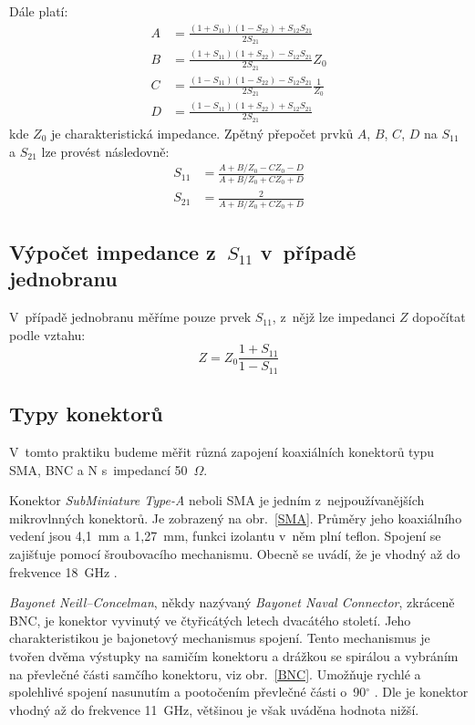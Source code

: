 \documentclass{protokol}
\newcommand\sparam{S}
\newcommand\impedance{Z}
\begin{document}
Dále platí:
\begin{align}
	\label{eq:tmatrix-elema}
	A &= \frac{(1+S_{11})(1-S_{22})+S_{12}S_{21}}{2S_{21}} \\
	\label{eq:tmatrix-elemb}
	B &= \frac{(1+S_{11})(1+S_{22})-S_{12}S_{21}}{2S_{21}} Z_0 \\
	\label{eq:tmatrix-elemc}
	C &= \frac{(1-S_{11})(1-S_{22})-S_{12}S_{21}}{2S_{21}} \frac{1}{Z_0} \\
	\label{eq:tmatrix-elemd}
	D &= \frac{(1-S_{11})(1+S_{22})+S_{12}S_{21}}{2S_{21}}
\end{align}
kde $\impedance_{0}$ je charakteristická impedance.
Zpětný přepočet prvků $A$, $B$, $C$, $D$ na $S_{11}$ a $S_{21}$
lze provést následovně:
\begin{align}
	\label{eq:s11}
	S_{11} &= \frac{A+B/Z_0-CZ_0-D}{A+B/Z_0+CZ_0+D} \\
	\label{eq:s21}
	S_{21} &= \frac{2}{A+B/Z_0+CZ_0+D}
\end{align}

\subsection{Výpočet impedance z~$\sparam_{11}$ v~případě jednobranu}
V~případě jednobranu měříme pouze prvek $\sparam_{11}$,
z~nějž lze impedanci $\impedance$ dopočítat podle vztahu:
\begin{equation}
	\impedance = \impedance_{0}\frac{1+\sparam_{11}}{1-\sparam_{11}}
	\label{eq:Z}
\end{equation}


\subsection{Typy konektorů}
V~tomto praktiku budeme měřit různá zapojení koaxiálních konektorů typu
SMA, BNC a N s~impedancí 50~$\Omega$.

Konektor \emph{SubMiniature Type-A} neboli SMA je jedním z~nejpoužívanějších
mikrovlnných konektorů. Je zobrazený na obr.~\ref{SMA}.
Průměry jeho koaxiálního vedení jsou 4,1~mm a 1,27~mm,
funkci izolantu v~něm plní teflon.
Spojení se zajišťuje pomocí šroubovacího mechanismu.
Obecně se uvádí, že je vhodný až do frekvence 18~GHz \cite{rfhandbook}.

\emph{Bayonet Neill--Concelman}, někdy nazývaný \emph{Bayonet Naval Connector},
zkráceně BNC, je konektor vyvinutý ve čtyřicátých letech dvacátého století.
Jeho charakteristikou je bajonetový mechanismus spojení.
Tento mechanismus je tvořen dvěma výstupky na samičím konektoru
a drážkou se spirálou a vybráním na převlečné části samčího konektoru,
viz obr.~\ref{BNC}.
Umožňuje rychlé a spolehlivé spojení nasunutím a pootočením převlečné
části o~90$^{\circ}$ \cite{czwiki}.
Dle \cite{rfhandbook} je konektor vhodný až do frekvence 11~GHz,
většinou je však uváděna hodnota nižší.
\end{document}
